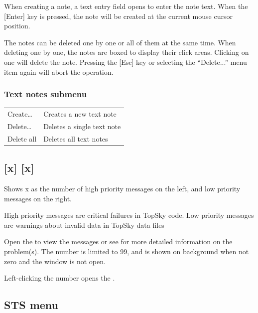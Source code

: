 \documentclass[a4paper,oneside,11pt]{memoir}
\begin{document}
\bigskip

When creating a note, a text entry field opens to enter the note text. When the [Enter] key is pressed, the note will be created at the current mouse cursor position.

\bigskip

The notes can be deleted one by one or all of them at the same time. When deleting one by one, the notes are boxed to display their click areas. Clicking on one will delete the note. Pressing the [Esc] key or selecting the “Delete...” menu item again will abort the operation.

\subsubsection{Text notes submenu}
\label{menu:tnm}

\begin{longtable}{p{5cm} p{7.5cm}}
  Create…     & Creates a new text note\\
  Delete…     & Deletes a single text note\\
  Delete all  & Deletes all text notes\\
\end{longtable}

\subsection{[x] [x]}
\label{menu:pqmm}

Shows x as the number of high priority messages on the left, and low priority messages on the right. 

\bigskip

High priority messages are critical failures in TopSky code. Low priority messages are warnings about invalid data in TopSky data files

\bigskip

Open the  to view the messages or see  for more detailed information on the problem(s). The number is limited to 99, and is shown on  background when not zero and the window is not open.

\bigskip

Left-clicking the number opens the .

\subsection{STS menu}
\label{menu:sts}
\end{document}
